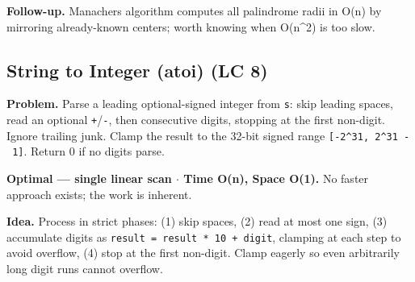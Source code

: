 \documentclass[11pt]{article}
\begin{document}
\textbf{Follow-up.} Manacher\textquotesingle s algorithm computes all palindrome radii in O(n) by mirroring already-known centers; worth knowing when O(n\^{}2) is too slow.

\subsection{String to Integer (atoi) (LC 8)}\label{string-to-integer-atoi-lc-8}

\textbf{Problem.} Parse a leading optional-signed integer from \texttt{s}: skip leading spaces, read an optional \texttt{+}/\texttt{-}, then consecutive digits, stopping at the first non-digit. Ignore trailing junk. Clamp the result to the 32-bit signed range \texttt{{[}-2\^{}31,\ 2\^{}31\ -\ 1{]}}. Return 0 if no digits parse.

\textbf{Optimal --- single linear scan \(\cdot\) Time O(n), Space O(1).} No faster approach exists; the work is inherent.

\textbf{Idea.} Process in strict phases: (1) skip spaces, (2) read at most one sign, (3) accumulate digits as \texttt{result\ =\ result\ *\ 10\ +\ digit}, clamping at each step to avoid overflow, (4) stop at the first non-digit. Clamp eagerly so even arbitrarily long digit runs cannot overflow.

\end{document}

